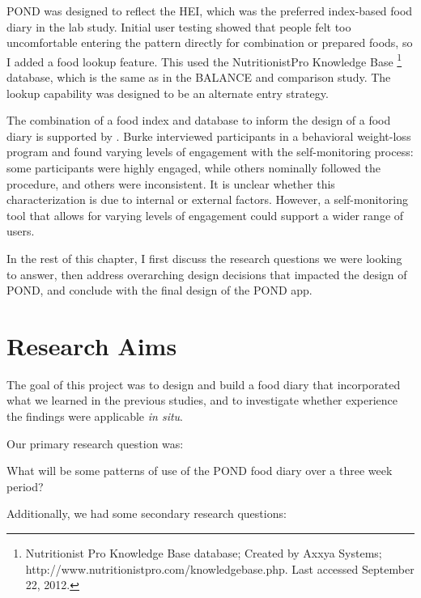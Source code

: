 POND was designed to reflect the HEI, which was the preferred index-based food diary in the lab study. Initial user testing showed that people felt too uncomfortable entering the pattern directly for combination or prepared foods, so I added a food lookup feature. This used the NutritionistPro Knowledge Base \footnote{Nutritionist Pro Knowledge Base database; Created by  Axxya Systems; http://www.nutritionistpro.com/knowledgebase.php. Last accessed September 22, 2012.} database, which is the same as in the BALANCE and comparison study. The lookup capability was designed to be an alternate entry strategy. 

The combination of a food index and database to inform the design of a food diary is supported by \citep{burke_experiences_2009}. Burke interviewed participants in a behavioral weight-loss program and found varying levels of engagement with the self-monitoring process: some participants were highly engaged, while others nominally followed the procedure, and others were inconsistent. It is unclear whether this characterization is due to internal or external factors. However, a self-monitoring tool that allows for varying levels of engagement could support a wider range of users. 

In the rest of this chapter, I first discuss the research questions we were looking to answer, then address overarching design decisions that impacted the design of POND, and conclude with the final design of the POND app. 

\section{Research Aims}
The goal of this project was to design and build a food diary that incorporated what we learned in the previous studies, and to investigate whether experience the findings were applicable \textit{in situ}. 

Our primary research question was: 

\begin{itemize*}
\item What will be some patterns of use of the POND food diary over a three week period? 
\end{itemize*}

Additionally, we had some secondary research questions: 

